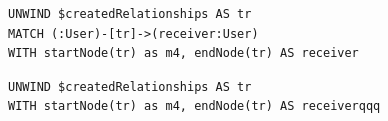 \begin{lstlisting}[language=Cypher,frame=single,caption={Unoptimized pattern matching},label={lst:not_optimized_pattern}]
UNWIND $createdRelationships AS tr
MATCH (:User)-[tr]->(receiver:User)
WITH startNode(tr) as m4, endNode(tr) AS receiver
\end{lstlisting}

\begin{lstlisting}[language=Cypher,frame=single,caption={A snippet of the optimized query with \texttt{startNode} and \texttt{endNode} methods},label={lst:snippet_start_end_nodes}]
UNWIND $createdRelationships AS tr
WITH startNode(tr) as m4, endNode(tr) AS receiverqqq
\end{lstlisting}
